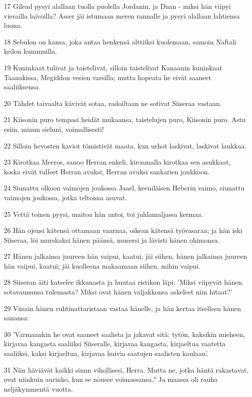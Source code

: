 \par 17 Gilead pysyi alallaan tuolla puolella Jordanin, ja Daan - miksi hän viipyi vierailla laivoilla? Asser jäi istumaan meren rannalle ja pysyi alallaan lahtiensa luona.
\par 18 Sebulon on kansa, joka antaa henkensä alttiiksi kuolemaan, samoin Naftali kedon kummuilla.
\par 19 Kuninkaat tulivat ja taistelivat, silloin taistelivat Kanaanin kuninkaat Taanakissa, Megiddon vesien varsilla; mutta hopeata he eivät saaneet saaliiksensa.
\par 20 Tähdet taivaalta kävivät sotaa, radoiltaan ne sotivat Siiseraa vastaan.
\par 21 Kiisonin puro tempasi heidät mukaansa, taistelujen puro, Kiisonin puro. Astu esiin, minun sieluni, voimallisesti!
\par 22 Silloin hevosten kaviot tömistivät maata, kun urhot laskivat, laskivat laukkaa.
\par 23 Kirotkaa Meeros, sanoo Herran enkeli, kiroamalla kirotkaa sen asukkaat, koska eivät tulleet Herran avuksi, Herran avuksi sankarien joukkoon.
\par 24 Siunattu olkoon vaimojen joukossa Jaael, keeniläisen Heberin vaimo, siunattu vaimojen joukossa, jotka teltoissa asuvat.
\par 25 Vettä toinen pyysi, maitoa hän antoi, toi juhlamaljassa kermaa.
\par 26 Hän ojensi kätensä ottamaan vaarnaa, oikean kätensä työvasaraa; ja hän iski Siiseraa, löi murskaksi hänen päänsä, musersi ja lävisti hänen ohimonsa.
\par 27 Hänen jalkainsa juureen hän vaipui, kaatui, jäi siihen, hänen jalkainsa juureen hän vaipui, kaatui; jäi kuolleena makaamaan siihen, mihin vaipui.
\par 28 Siiseran äiti katselee ikkunasta ja huutaa ristikon läpi: 'Miksi viipyvät hänen sotavaununsa tulemasta? Miksi ovat hänen valjakkonsa askeleet niin hitaat?'
\par 29 Viisain hänen ruhtinattaristaan vastaa hänelle, ja hän kertaa itselleen hänen sanansa:
\par 30 'Varmaankin he ovat saaneet saalista ja jakavat sitä: tytön, kaksikin mieheen, kirjavaa kangasta saaliiksi Siiseralle, kirjavaa kangasta, kirjaeltua vaatetta saaliiksi, kaksi kirjaeltua, kirjavaa huivia saatujen saalisten kaulaan'.
\par 31 Niin häviävät kaikki sinun vihollisesi, Herra. Mutta ne, jotka häntä rakastavat, ovat niinkuin aurinko, kun se nousee voimassansa." Ja maassa oli rauha neljäkymmentä vuotta.

